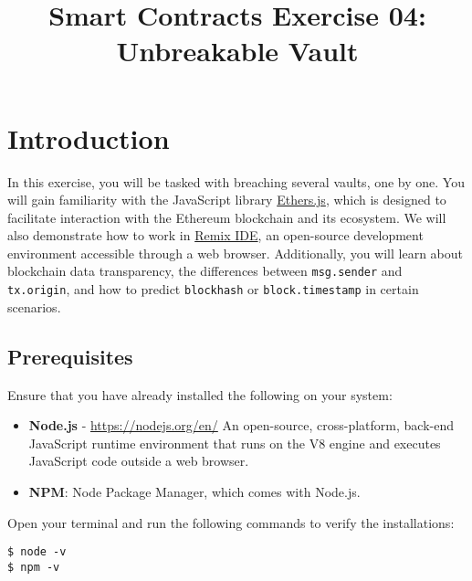 \documentclass[12pt]{article}
\title{Smart Contracts Exercise 04: \\ Unbreakable Vault}
\author{}
\date{}
\begin{document}
\maketitle
\section{Introduction}
In this exercise, you will be tasked with breaching several vaults, one by one. You will gain familiarity with the JavaScript library \href{https://docs.ethers.org/v6}{Ethers.js}, which is designed to facilitate interaction with the Ethereum blockchain and its ecosystem. We will also demonstrate how to work in \href{https://remix.ethereum.org/}{Remix IDE}, an open-source development environment accessible through a web browser. Additionally, you will learn about blockchain data transparency, the differences between \texttt{msg.sender} and \texttt{tx.origin}, and how to predict \texttt{blockhash} or \texttt{block.timestamp} in certain scenarios.



\subsection*{Prerequisites}

Ensure that you have already installed the following on your system:

\begin{itemize}
    \item \textbf{Node.js} - \url{https://nodejs.org/en/}
    An open-source, cross-platform, back-end JavaScript runtime environment that runs on the V8 engine and executes JavaScript code outside a web browser. 
    \item \textbf{NPM}: Node Package Manager, which comes with Node.js.
\end{itemize}

Open your terminal and run the following commands to verify the installations:

\begin{verbatim}
$ node -v
$ npm -v
\end{verbatim}
\end{document}
